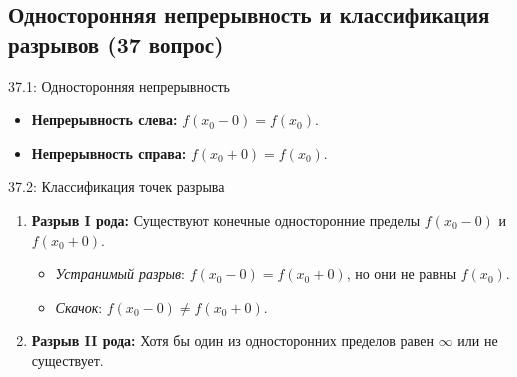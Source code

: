 \documentclass[a4paper,12pt]{article}
\begin{document}
	
	
	\newpage
	\subsection{Односторонняя непрерывность и классификация разрывов (37 вопрос)}
	
	\begin{definitionbox}{37.1: Односторонняя непрерывность}
		\begin{itemize}
			\item \textbf{Непрерывность слева:} $f(x_0 - 0) = f(x_0)$.
			\item \textbf{Непрерывность справа:} $f(x_0 + 0) = f(x_0)$.
		\end{itemize}
	\end{definitionbox}
	
	\begin{definitionbox}{37.2: Классификация точек разрыва}
		\begin{enumerate}
			\item \textbf{Разрыв I рода:} Существуют конечные односторонние пределы $f(x_0-0)$ и $f(x_0+0)$.
			\begin{itemize}
				\item \textit{Устранимый разрыв}: $f(x_0-0) = f(x_0+0)$, но они не равны $f(x_0)$.
				\item \textit{Скачок}: $f(x_0-0) \neq f(x_0+0)$.
			\end{itemize}
			\item \textbf{Разрыв II рода:} Хотя бы один из односторонних пределов равен $\infty$ или не существует.
		\end{enumerate}
	\end{definitionbox}
	
	\begin{center}
	\end{center}
	
	
	
\end{document}
